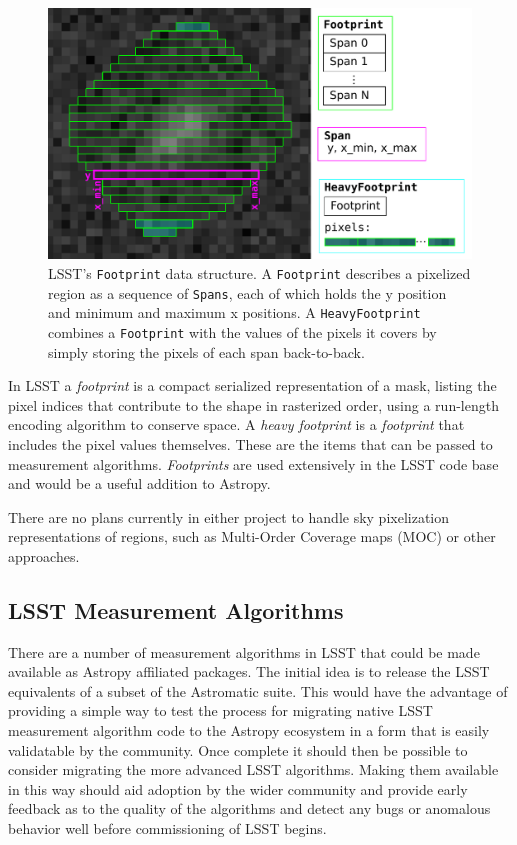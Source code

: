\documentclass[]{spie}  %
\begin{document}
\begin{figure} [t]
\begin{center}
\includegraphics[width=\textwidth]{footprint}
\end{center}
\caption[footprint]
{\label{fig:footprint}
LSST's \texttt{Footprint} data structure.
A \texttt{Footprint} describes a pixelized region as a sequence of \texttt{Spans}, each of which holds the y position and minimum and maximum x positions.  A \texttt{HeavyFootprint} combines a \texttt{Footprint} with the values of the pixels it covers by simply storing the pixels of each span back-to-back.}
\end{figure}

In LSST a \emph{footprint} is a compact serialized representation of a mask, listing the pixel indices that contribute to the shape in rasterized order, using a run-length encoding algorithm to conserve space.
A \emph{heavy footprint} is a \emph{footprint} that includes the pixel values themselves.
These are the items that can be passed to measurement algorithms.
\emph{Footprints} are used extensively in the LSST code base and would be a useful addition to Astropy.

There are no plans currently in either project to handle sky pixelization representations of regions, such as Multi-Order Coverage maps (MOC)\cite{2012ASPC..461..347F,2014ivoa.spec.0602F} or other approaches\cite{2015A&A...580A.132R}.

\subsection{LSST Measurement Algorithms}

There are a number of measurement algorithms in LSST that could be made available as Astropy affiliated packages\cite{bosch_2016_48435}.
The initial idea is to release the LSST equivalents of a subset of the Astromatic suite\cite{2012ASSP...29...71B}.
This would have the advantage of providing a simple way to test the process for migrating native LSST measurement algorithm code to the Astropy ecosystem in a form that is easily validatable by the community.
Once complete it should then be possible to consider migrating the more advanced LSST algorithms.
Making them available in this way should aid adoption by the wider community and provide early feedback as to the quality of the algorithms and detect any bugs or anomalous behavior well before commissioning of LSST begins.
\end{document}
